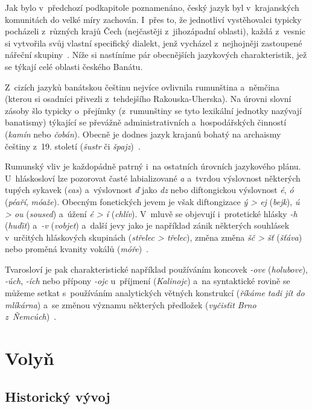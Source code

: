 Jak bylo v~předchozí podkapitole poznamenáno, český jazyk byl v~krajanských komunitách do velké míry zachován. I~přes to, že jednotliví vystěhovalci typicky pocházeli z~různých krajů Čech (nejčastěji z~jihozápadní oblasti), každá z~vesnic si vytvořila svůj vlastní specifický dialekt, jenž vycházel z~nejhojněji zastoupené nářeční skupiny~\parencite{Gecse2013}. Níže si nastíníme pár obecnějších jazykových charakteristik, jež se týkají celé oblasti českého Banátu.

Z~cizích jazyků banátskou češtinu nejvíce ovlivnila rumunština a~němčina (kterou si osadníci přivezli z~tehdejšího Rakouska-Uherska). Na úrovni slovní zásoby šlo typicky o~přejímky (z~rumunštiny se tyto lexikální jednotky nazývají banatismy) týkající se převážně administrativních a~hospodářských činností (\emph{kamín} nebo \emph{čobán}). Obecně je dodnes jazyk krajanů bohatý na archaismy češtiny z~19. století (\emph{šustr} či \emph{špajz})~\parencite{Frnochova2012}.

Rumunský vliv je každopádně patrný i~na ostatních úrovních jazykového plánu. U~hláskosloví lze pozorovat časté labializované \emph{a} a~tvrdou výslovnost některých tupých sykavek (\emph{cas}) a~výslovnost \emph{ď }jako \emph{dz} nebo diftongickou výslovnost \emph{é}, \emph{ó} (\emph{péaří}, \emph{móaže}). Obecným fonetických jevem je však diftongizace \emph{ý \textgreater{} ej} (\emph{bejk}), \emph{ú \textgreater{} ou} (\emph{soused}) a~úžení \emph{é \textgreater{} í} (\emph{chlív}). V~mluvě se objevují i~protetické hlásky \emph{-h} (\emph{huďit}) a~\emph{-v} (\emph{vobjet}) a~další jevy jako je například zánik některých souhlásek v~určitých hláskových skupinách (\emph{střelec \textgreater{} třelec}), změna změna \emph{šč \textgreater{} šť} (\emph{šťáva}) nebo proměná kvanity vokálů (\emph{móře})~\parencite{Skulina1976}.

Tvarosloví je pak charakteristické například používáním koncovek \emph{-ove} (\emph{holubove}), \emph{-úch}, \emph{-ích} nebo přípony \emph{-ojc} u~příjmení (\emph{Kalinojc}) a~na syntaktické rovině se můžeme setkat s~používáním analytických větných konstrukcí (\emph{říkáme tadi jít do mlíkárna}) a~se změnou významu některých předložek (\emph{vyčisťit Brno z~Ňemcúch})~\parencite{Skulina1976}.

\hypertarget{volyux148}{%
\section{Volyň}\label{volyux148}}

\hypertarget{historickuxfd-vuxfdvoj-1}{%
\subsection*{Historický vývoj}\label{historickuxfd-vuxfdvoj-1}}

